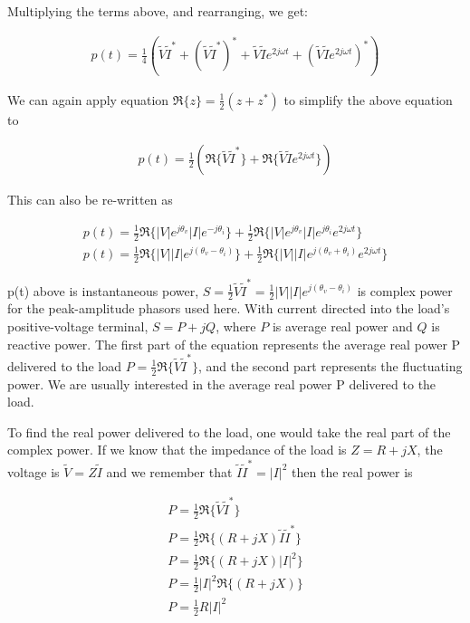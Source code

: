 \documentclass{ximera}
\begin{document}
Multiplying the terms above, and rearranging, we get:


\begin{eqnarray}
p(t)=\frac{1}{4} (\tilde{V}\tilde{I}^*+ (\tilde{V}\tilde{I}^*)^*+ \tilde{V}\tilde{I} e^{2j \omega t}+ (\tilde{V}\tilde{I} e^{2j \omega t})^*)
\end{eqnarray}

We can again apply equation $\Re\{z\}=\frac{1}{2}(z +z^*)$ to simplify the above equation to

\begin{eqnarray}
p(t)=\frac{1}{2} (\Re\{\tilde{V}\tilde{I}^*\}+ \Re\{\tilde{V}\tilde{I} e^{2j \omega t }\})
\end{eqnarray}

This can also be re-written as

\begin{eqnarray}
p(t)=\frac{1}{2} \Re\{ |V| e^{j\theta_v} |I| e^{-j\theta_i} \}+ \frac{1}{2} \Re\{|V| e^{j\theta_v} |I| e^{j\theta_i} e^{2j \omega t }\} \\
p(t)=\frac{1}{2} \Re\{ |V| |I| e^{j(\theta_v-\theta_i)} \}+ \frac{1}{2} \Re\{|V| |I|  e^{j(\theta_v+\theta_i)}  e^{2j \omega t }\}
\end{eqnarray}


p(t) above is instantaneous power, $S=\frac{1}{2}\tilde{V}\tilde{I}^*=\frac{1}{2}|V| |I| e^{j(\theta_v-\theta_i)}$ is complex power for the peak-amplitude phasors used here. With current directed into the load's positive-voltage terminal, $S=P+jQ$, where $P$ is average real power and $Q$ is reactive power. The first part of the equation represents the average real power P delivered to the load $P=\frac{1}{2}\Re\{\tilde{V}\tilde{I}^*\}$, and the second part represents the fluctuating power. We are usually interested in the average real power P delivered to the load.

To find the real power delivered to the load, one would take the real part of the complex power. If we know that the impedance of the load is $Z=R+jX$, the voltage is $ \tilde{V} = Z \tilde{I}$ and we remember that $\tilde{I} \tilde{I}^* = |I|^2$ then the real power is

\begin{eqnarray}
P=\frac{1}{2}\Re\{ \tilde{V} \tilde{I}^*  \} \\
P=\frac{1}{2}\Re\{ (R+jX) \tilde{I} \tilde{I}^*  \} \\
P=\frac{1}{2}\Re\{ (R+jX) |I|^2  \} \\
P=\frac{1}{2}|I|^2 \Re\{ (R+jX)   \} \\
P=\frac{1}{2}R |I|^2 
\end{eqnarray}
\end{document}
